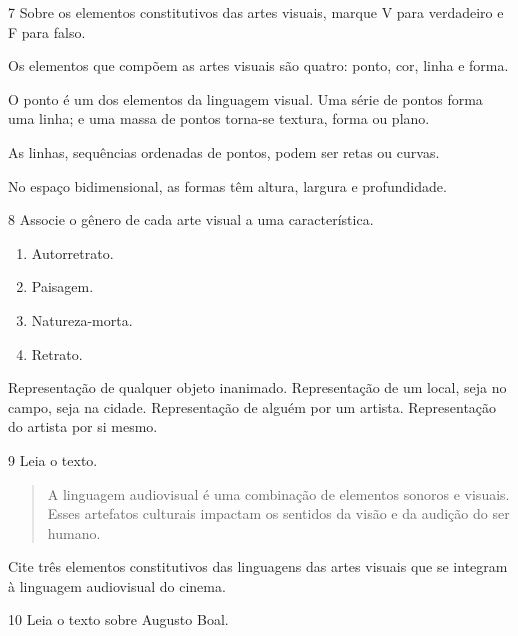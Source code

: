 \num{7} Sobre os elementos constitutivos das artes visuais, marque V para
verdadeiro e F para falso.

\begin{boxlist}
 Os elementos que compõem as artes visuais são quatro: ponto, cor, linha e forma. 

 O ponto é um dos elementos da linguagem visual. Uma série de pontos forma uma linha; e uma massa de pontos torna-se textura, forma ou plano. 

 As linhas, sequências ordenadas de pontos, podem ser retas ou curvas. 

 No espaço bidimensional, as formas têm altura, largura e profundidade. 
\end{boxlist}

\num{8} Associe o gênero de cada arte visual a uma característica.

\begin{multicols}{2}
\begin{enumerate}
  \item Autorretrato.
  \item Paisagem.
  \item Natureza-morta.
  \item Retrato.
\end{enumerate}
\end{multicols}

\begin{boxlist}
   Representação de qualquer objeto inanimado.
   Representação de um local, seja no campo, seja na cidade.
   Representação de alguém por um artista.
   Representação do artista por si mesmo.
\end{boxlist}

\num{9} Leia o texto.

\begin{quote}
A linguagem audiovisual é uma combinação de elementos sonoros e visuais. Esses artefatos culturais impactam os sentidos da visão e da audição do ser humano.

\end{quote}

Cite três elementos constitutivos das linguagens das artes visuais que
se integram à linguagem audiovisual do cinema.



\num{10} Leia o texto sobre Augusto Boal.

